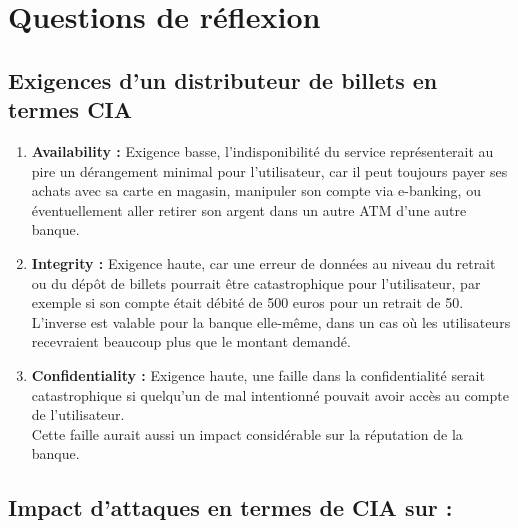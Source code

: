 \documentclass{report}
\begin{document}
	\section{Questions de réflexion}

		\subsection{Exigences d'un distributeur de billets en termes CIA}

			\begin{enumerate}
				\item \textbf{Availability : } Exigence basse, l'indisponibilité du service représenterait au pire un dérangement minimal pour l'utilisateur, car il peut toujours payer ses achats avec sa carte en magasin, manipuler son compte via e-banking, ou éventuellement aller retirer son argent dans un autre ATM d'une autre banque.\\
				\item \textbf{Integrity : } Exigence haute, car une erreur de données au niveau du retrait ou du dépôt de billets pourrait être catastrophique pour l'utilisateur, par exemple si son compte était débité de 500 euros pour un retrait de 50.\\
				L'inverse est valable pour la banque elle-même, dans un cas où les utilisateurs recevraient beaucoup plus que le montant demandé.\\
				\item \textbf{Confidentiality : } Exigence haute, une faille dans la confidentialité serait catastrophique si quelqu'un de mal intentionné pouvait avoir accès au compte de l'utilisateur.\\
				Cette faille aurait aussi un impact considérable sur la réputation de la banque.\\
			\end{enumerate}

		\subsection{Impact d'attaques en termes de CIA sur : }
\end{document}
